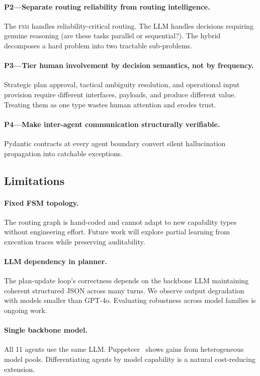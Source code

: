 \documentclass[11pt,a4paper]{article}
\newcommand{\fsm}{\textsc{fsm}}
\begin{document}
\paragraph{P2---Separate routing reliability from routing intelligence.} The \fsm{} handles reliability-critical routing. The LLM handles decisions requiring genuine reasoning (are these tasks parallel or sequential?). The hybrid decomposes a hard problem into two tractable sub-problems.

\paragraph{P3---Tier human involvement by decision semantics, not by frequency.} Strategic plan approval, tactical ambiguity resolution, and operational input provision require different interfaces, payloads, and produce different value. Treating them as one type wastes human attention and erodes trust.

\paragraph{P4---Make inter-agent communication structurally verifiable.} Pydantic contracts at every agent boundary convert silent hallucination propagation into catchable exceptions.

\subsection{Limitations}

\paragraph{Fixed FSM topology.} The routing graph is hand-coded and cannot adapt to new capability types without engineering effort. Future work will explore partial learning from execution traces while preserving auditability.

\paragraph{LLM dependency in planner.} The plan-update loop's correctness depends on the backbone LLM maintaining coherent structured JSON across many turns. We observe output degradation with models smaller than GPT-4o. Evaluating robustness across model families is ongoing work.

\paragraph{Single backbone model.} All 11 agents use the same LLM. Puppeteer~\cite{puppeteer2025} shows gains from heterogeneous model pools. Differentiating agents by model capability is a natural cost-reducing extension.
\end{document}
